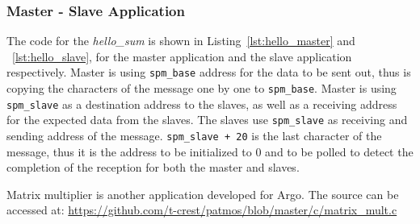\documentclass[a4paper,fontsize=10pt,twoside,DIV15,BCOR12mm,headinclude=true,footinclude=false,pagesize,bibtotoc]{scrbook}
\newcommand{\code}[1]{{\texttt{#1}}}
\begin{document}
\subsubsection{Master - Slave Application}
The code for the \textit{hello\_sum} is shown in Listing~\ref{lst:hello_master} and ~\ref{lst:hello_slave}, 
for the master application and the slave application respectively.
Master is using \code{spm\_base} address for the data to be sent out, thus is copying the characters of the message one by one to \code{spm\_base}.
Master is using \code{spm\_slave} as a destination address to the slaves, as well as a receiving address for the expected data from the slaves. 
The slaves use \code{spm\_slave} as receiving and sending address of the message. \code{spm\_slave + 20} is the last character of the message, 
thus it is the address to be initialized to 0 and to be polled to detect the completion of the reception for both the master and slaves.

%
%
%



Matrix multiplier is another application developed for Argo. 
The source can be accessed at: 
\url{https://github.com/t-crest/patmos/blob/master/c/matrix_mult.c}



\end{document}
